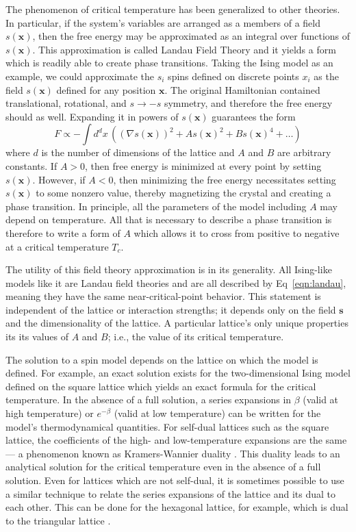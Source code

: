 \documentclass[
  amsmath,
  amssymb,
  aps,
  twocolumn,
  nofootinbib,
  floatfix,
]{revtex4-2}
\newcommand{\parens}[1]{\left ( #1 \right )}
\begin{document}
The phenomenon of critical temperature has been generalized to other theories. In particular, if the system's variables are arranged as a members of a field $s(\bm x)$, then the free energy may be approximated as an integral over functions of $s(\bm x)$. This approximation is called Landau Field Theory and it yields a form which is readily able to create phase transitions. Taking the Ising model as an example, we could approximate the $s_i$ spins defined on discrete points $x_i$ as the field $s(\bm x)$ defined for any position $\bm x$. The original Hamiltonian contained translational, rotational, and $s\rightarrow-s$ symmetry, and therefore the free energy should as well. Expanding it in powers of $s(\bm x)$ guarantees the form
\begin{equation}
F \propto -\int d^d x \, \parens{(\nabla s(\bm x))^2 + A s(\bm x)^2 + B s(\bm x)^4 + \dots}
\label{eqn:landau}
\end{equation}
where $d$ is the number of dimensions of the lattice and $A$ and $B$ are arbitrary constants. If $A>0$, then free energy is minimized at every point by setting $s(\bm x)$. However, if $A<0$, then minimizing the free energy necessitates setting $s(\bm x)$ to some nonzero value, thereby magnetizing the crystal and creating a phase transition. In principle, all the parameters of the model including $A$ may depend on temperature. All that is necessary to describe a phase transition is therefore to write a form of $A$ which allows it to cross from positive to negative at a critical temperature $T_c$.

The utility of this field theory approximation is in its generality. All Ising-like models like it are Landau field theories and are all described by Eq~\ref{eqn:landau}, meaning they have the same near-critical-point behavior. This statement is independent of the lattice or interaction strengths; it depends only on the field $\bm s$ and the dimensionality of the lattice. A particular lattice's only unique properties its its values of $A$ and $B$; i.e., the value of its critical temperature.

The solution to a spin model depends on the lattice on which the model is defined. For example, an exact solution exists for the two-dimensional Ising model defined on the square lattice which yields an exact formula for the critical temperature. In the absence of a full solution, a series expansions in $\beta$ (valid at high temperature) or $e^{-\beta}$ (valid at low temperature) can be written for the model's thermodynamical quantities. For self-dual lattices such as the square lattice, the coefficients of the high- and low-temperature expansions are the same --- a phenomenon known as Kramers-Wannier duality \cite{kramers}. This duality leads to an analytical solution for the critical temperature even in the absence of a full solution. Even for lattices which are not self-dual, it is sometimes possible to use a similar technique to relate the series expansions of the lattice and its dual to each other. This can be done for the hexagonal lattice, for example, which is dual to the triangular lattice \cite{bhattacharjee1995fifty}.
\end{document}
